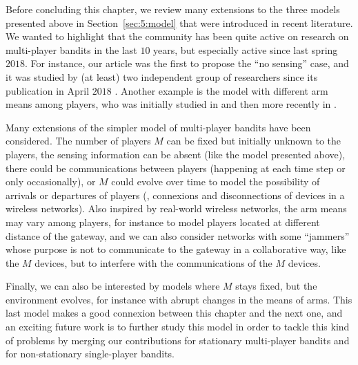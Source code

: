 Before concluding this chapter, we review many extensions to the three models presented above in Section~\ref{sec:5:model} that were introduced in recent literature.
%
We wanted to highlight that the community has been quite active on research on multi-player bandits in the last $10$ years, but especially active since last spring $2018$.
For instance, our article \cite{Besson2018ALT} was the first to propose the ``no sensing'' case, and it was studied by (at least) two independent group of researchers since its publication in April $2018$ \cite{BoursierPerchet18,LugosiMehrabian18}.
Another example is the model with different arm means among players, who was initially studied in \cite{Anandkumar10,Kalathil12} and then more recently in \cite{Bistritz18,KaufmannAbbas19}.
%

Many extensions of the simpler model of multi-player bandits have been considered.
The number of players $M$ can be fixed but initially unknown to the players, the sensing information can be absent (like the model \modeltrois{} presented above), there could be communications between players (happening at each time step or only occasionally), or $M$ could evolve over time to model the possibility of arrivals or departures of players (\ie, connexions and disconnections of devices in a wireless networks).
Also inspired by real-world wireless networks, the arm means may vary among players, for instance to model players located at different distance of the gateway, and we can also consider networks with some ``jammers'' whose purpose is not to communicate to the gateway in a collaborative way, like the $M$ devices, but to interfere with the communications of the $M$ devices.

Finally, we can also be interested by models where $M$ stays fixed, but the environment evolves, for instance with abrupt changes in the means of arms. This last model makes a good connexion between this chapter and the next one, and an exciting future work is to further study this model in order to tackle this kind of problems by merging our contributions for stationary multi-player bandits and for non-stationary single-player bandits.

